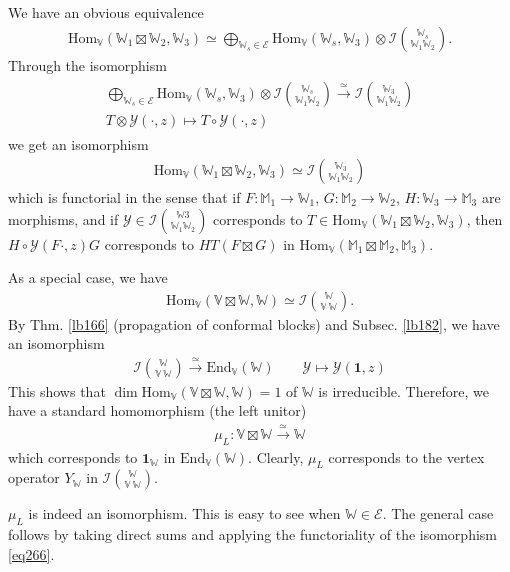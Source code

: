 \documentclass[12pt,a4paper,notitlepage]{article}
\theoremstyle{definition}
\theoremstyle{plain}
\newcommand{\mc}{\mathcal}
\newcommand{\End}{\mathrm{End}} %
\newcommand{\id}{\mathbf{1}}
\newcommand{\Hom}{\mathrm{Hom}}
\newcommand{\Vbb}{\mathbb V}
\newcommand{\Wbb}{\mathbb W}
\newcommand{\Mbb}{\mathbb M}
\numberwithin{equation}{section}
\begin{document}
We have an obvious equivalence
\begin{align*}
\Hom_\Vbb(\Wbb_1\boxtimes\Wbb_2,\Wbb_3)\simeq \bigoplus_{\Wbb_s\in\mc E}\Hom_\Vbb(\Wbb_s,\Wbb_3)\otimes \mc I{\Wbb_s\choose \Wbb_1\Wbb_2}.
\end{align*}
Through the isomorphism
\begin{gather}
\begin{gathered}
\bigoplus_{\Wbb_s\in\mc E}\Hom_\Vbb(\Wbb_s,\Wbb_3)\otimes \mc I{\Wbb_s\choose \Wbb_1\Wbb_2}\xrightarrow{\simeq} \mc I{\Wbb_3\choose \Wbb_1\Wbb_2}\\
T\otimes\mc Y(\cdot,z)\mapsto T\circ\mc Y(\cdot,z) 
\end{gathered}
\end{gather}
we get an isomorphism
\begin{align}
\Hom_\Vbb(\Wbb_1\boxtimes\Wbb_2,\Wbb_3)\simeq\mc I{\Wbb_3\choose \Wbb_1\Wbb_2}\label{eq266}
\end{align}
which is functorial in the sense that if $F:\Mbb_1\rightarrow\Wbb_1$, $G:\Mbb_2\rightarrow\Wbb_2$, $H:\Wbb_3\rightarrow\Mbb_3$ are morphisms, and if $\mc Y\in\mc I{\Wbb3\choose \Wbb_1\Wbb_2}$ corresponds to $T\in\Hom_\Vbb(\Wbb_1\boxtimes\Wbb_2,\Wbb_3)$, then $H\circ\mc Y(F\cdot,z)G$ corresponds to $HT(F\boxtimes G)$ in $\Hom_\Vbb(\Mbb_1\boxtimes\Mbb_2,\Mbb_3)$.

As a special case, we have
\begin{align}
\Hom_\Vbb(\Vbb\boxtimes\Wbb,\Wbb)\simeq\mc I{\Wbb\choose\Vbb~\Wbb}.
\end{align}
By Thm. \ref{lb166} (propagation of conformal blocks) and Subsec. \ref{lb182}, we have an isomorphism
\begin{gather*}
\mc I{\Wbb\choose\Vbb~\Wbb}\xrightarrow{\simeq}\End_\Vbb(\Wbb)\qquad\mc Y\mapsto \mc Y(\id,z)
\end{gather*}
This shows that $\dim\Hom_\Vbb(\Vbb\boxtimes\Wbb,\Wbb)=1$ of $\Wbb$ is irreducible. Therefore, we have a standard homomorphism (the left unitor)
\begin{align}
\mu_L:\Vbb\boxtimes\Wbb\xrightarrow{\simeq}\Wbb
\end{align}
which corresponds to $\id_\Wbb$ in $\End_\Vbb(\Wbb)$. Clearly, $\mu_L$ corresponds to the vertex operator $Y_\Wbb$ in $\mc I{\Wbb\choose\Vbb~\Wbb}$.

$\mu_L$ is indeed an isomorphism. This is easy to see when $\Wbb\in\mc E$. The general case follows by taking direct sums and applying the functoriality of the isomorphism \eqref{eq266}.
\end{document}
